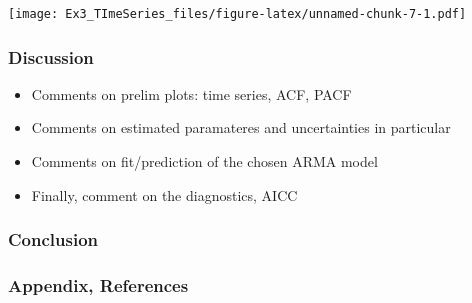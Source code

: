 \documentclass[]{article}
\newenvironment{Shaded}{\begin{snugshade}}{\end{snugshade}}
\newcommand{\KeywordTok}[1]{\textcolor[rgb]{0.13,0.29,0.53}{\textbf{#1}}}
\newcommand{\DataTypeTok}[1]{\textcolor[rgb]{0.13,0.29,0.53}{#1}}
\newcommand{\DecValTok}[1]{\textcolor[rgb]{0.00,0.00,0.81}{#1}}
\newcommand{\StringTok}[1]{\textcolor[rgb]{0.31,0.60,0.02}{#1}}
\newcommand{\CommentTok}[1]{\textcolor[rgb]{0.56,0.35,0.01}{\textit{#1}}}
\newcommand{\OperatorTok}[1]{\textcolor[rgb]{0.81,0.36,0.00}{\textbf{#1}}}
\newcommand{\NormalTok}[1]{#1}
\begin{document}
\begin{Shaded}
\end{Shaded}

\texttt{[image: Ex3\_TImeSeries\_files/figure-latex/unnamed-chunk-7-1.pdf]}

\subsubsection{Discussion}\label{discussion}

\begin{itemize}
\item
  Comments on prelim plots: time series, ACF, PACF
\item
  Comments on estimated paramateres and uncertainties in particular
\item
  Comments on fit/prediction of the chosen ARMA model
\item
  Finally, comment on the diagnostics, AICC
\end{itemize}

\subsubsection{Conclusion}\label{conclusion}

\subsubsection{Appendix, References}\label{appendix-references}
\end{document}
